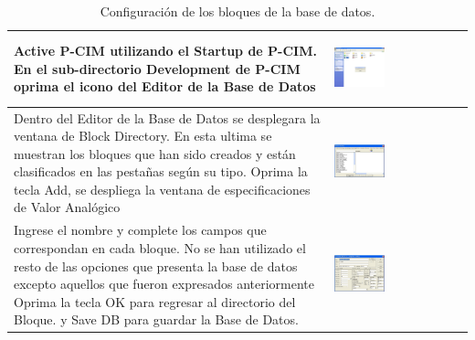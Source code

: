 \begin{table}[!ht]
\centering
\renewcommand*{\arraystretch}{0.01}
\begin{tabular}{*{2}{m{}}}
\hline
  Active P-CIM utilizando el Startup de P-CIM. En el sub-directorio Development 
  de P-CIM oprima el icono del Editor de la Base de Datos
  &\begin{center}
    \includegraphics[width=0.4\textwidth]
      {Cap5-SCADA/images/startUp.jpeg}
  \end{center}\\
\hline
    Dentro del Editor de la Base de Datos se desplegara la ventana de Block 
    Directory. En esta ultima se muestran los bloques que han sido creados y 
    están clasificados en las pestañas según su tipo.  Oprima la tecla Add, se 
    despliega la ventana de especificaciones de Valor Analógico 
    &\begin{center}
      \includegraphics[width=0.4\textwidth]
	{Cap5-SCADA/images/database.jpeg}
    \end{center}\\
\hline
    Ingrese el nombre y complete los campos que correspondan en cada bloque. 
    No se han utilizado el resto de las opciones que presenta la base de datos 
    excepto aquellos que fueron expresados anteriormente 
    Oprima la tecla OK para regresar al directorio del Bloque.
    y Save DB para guardar la Base de Datos.
    &\begin{center}
      \includegraphics[width=0.4\textwidth]
	{Cap5-SCADA/images/database1.jpeg}
    \end{center}\\
\hline
\end{tabular}
\caption{Configuración de los bloques de la base de datos.}
\label{tab:confBlockDB}
\end{table}



